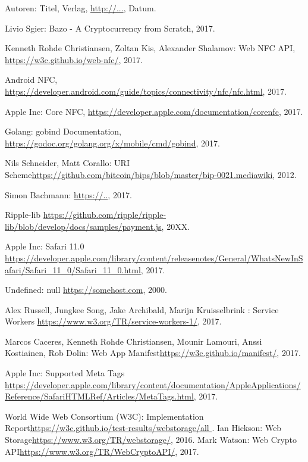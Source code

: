 \begin{thebibliography}{99}

 Autoren: Titel, Verlag, \url{http://...}, Datum.

 Livio Sgier: Bazo - A Cryptocurrency from Scratch, 2017.

 Kenneth Rohde Christiansen, Zoltan Kis, Alexander Shalamov: Web NFC API, \url{https://w3c.github.io/web-nfc/}, 2017.


 Android NFC, \url{https://developer.android.com/guide/topics/connectivity/nfc/nfc.html}, 2017.

 Apple Inc: Core NFC, \url{https://developer.apple.com/documentation/corenfc}, 2017.

 Golang: gobind Documentation, \url{https://godoc.org/golang.org/x/mobile/cmd/gobind}, 2017.

 Nils Schneider, Matt Corallo: URI Scheme\url{https://github.com/bitcoin/bips/blob/master/bip-0021.mediawiki}, 2012.

 Simon Bachmann:  \url{https://..}, 2017.

 Ripple-lib  \url{https://github.com/ripple/ripple-lib/blob/develop/docs/samples/payment.js}, 20XX.

 Apple Inc: Safari 11.0  \url{https://developer.apple.com/library/content/releasenotes/General/WhatsNewInSafari/Safari_11_0/Safari_11_0.html}, 2017.

 Undefined: null \url{https://somehost.com}, 2000.

 Alex Russell, Jungkee Song, Jake Archibald, Marijn Kruisselbrink : Service Workers \url{https://www.w3.org/TR/service-workers-1/}, 2017.

 Marcos Caceres, 
Kenneth Rohde Christiansen, Mounir Lamouri, Anssi Kostiainen, Rob Dolin: Web App Manifest\url{https://w3c.github.io/manifest/}, 2017.

 Apple Inc: Supported Meta Tags \url{https://developer.apple.com/library/content/documentation/AppleApplications/Reference/SafariHTMLRef/Articles/MetaTags.html}, 2017.

 World Wide Web Consortium (W3C): Implementation Report\url{https://w3c.github.io/test-results/webstorage/all
}.
 Ian Hickson: Web Storage\url{https://www.w3.org/TR/webstorage/}, 2016.
 Mark Watson: Web Crypto API\url{https://www.w3.org/TR/WebCryptoAPI/}, 2017.


\end{thebibliography}
